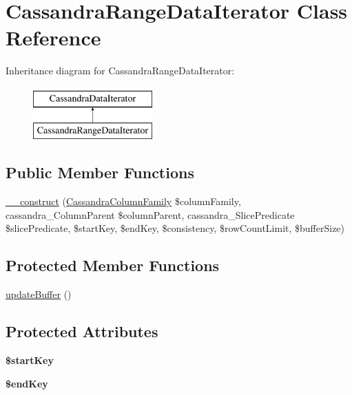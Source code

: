 \hypertarget{classCassandraRangeDataIterator}{
\section{CassandraRangeDataIterator Class Reference}
\label{classCassandraRangeDataIterator}
}
Inheritance diagram for CassandraRangeDataIterator:\begin{figure}[H]
\begin{center}
\leavevmode
\includegraphics[height=2.000000cm]{classCassandraRangeDataIterator}
\end{center}
\end{figure}
\subsection*{Public Member Functions}
\begin{DoxyCompactItemize}
\item 
\hyperlink{classCassandraRangeDataIterator_a89ad9afec67135eed73321396c6581b1}{\_\-\_\-construct} (\hyperlink{classCassandraColumnFamily}{CassandraColumnFamily} \$columnFamily, cassandra\_\-ColumnParent \$columnParent, cassandra\_\-SlicePredicate \$slicePredicate, \$startKey, \$endKey, \$consistency, \$rowCountLimit, \$bufferSize)
\end{DoxyCompactItemize}
\subsection*{Protected Member Functions}
\begin{DoxyCompactItemize}
\item 
\hyperlink{classCassandraRangeDataIterator_a743234ebb424200a5c3d7473ce95dbba}{updateBuffer} ()
\end{DoxyCompactItemize}
\subsection*{Protected Attributes}
\begin{DoxyCompactItemize}
\item 
\hypertarget{classCassandraRangeDataIterator_ac977d1d6c76e705920dc8394a00009c5}{
{\bfseries \$startKey}}
\label{classCassandraRangeDataIterator_ac977d1d6c76e705920dc8394a00009c5}

\item 
\hypertarget{classCassandraRangeDataIterator_acd5cccd82a215f9a2becd2cf4f635a50}{
{\bfseries \$endKey}}
\label{classCassandraRangeDataIterator_acd5cccd82a215f9a2becd2cf4f635a50}

\end{DoxyCompactItemize}


